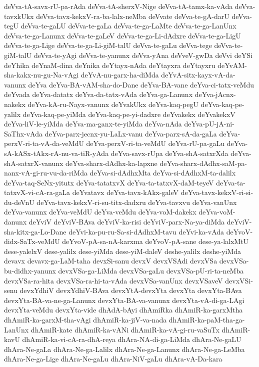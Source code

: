 {deVva-tA-savx-rU-pa-rAda
deVva-tA-sherxV-Nige
deVva-tA-tamx-ka-vAda
deVva-tavxkUkx
deVva-tavx-kekxV-ra-ba-lalx-neMba
deVvate
deVva-te-gA-darU
deVva-tegU
deVva-te-gaLU
deVva-te-gaLa
deVva-te-ga-LaMte
deVva-te-ga-LanUnx
deVva-te-ga-Lanunx
deVva-te-gaLeV
deVva-te-ga-Li-dAdxre
deVva-te-ga-LigU
deVva-te-ga-Lige
deVva-te-ga-Li-giM-talU
deVva-te-gaLu
deVva-tege
deVva-te-giM-talU
deVva-te-yAgi
deVva-te-yanunx
deVva-yAna
deVveV-gwDa
deVvi
deYSi
deYhika
deYnaM-dina
deYnika
deYtayx-nAda
deYtayxra
deYtayxru
deYvAM-sha-kakx-nu-gu-Na-vAgi
deYvA-nu-garx-ha-diMda
deYvA-sitx-kayx-vA-da-vanunx
deYva
deYva-BA-vAM-sha-do-Dane
deYva-BA-vane
deYva-ci-tatx-veMdu
deYvada
deYva-datatx
deYva-da-tatx-vAda
deYva-ga-Lanunx
deYva-jAcnx-nakekx
deYva-kA-ru-Nayx-vanunx
deYvakUkx
deYva-kaq-pegU
deYva-kaq-pe-yalilx
deYva-kaq-pe-yiMda
deYva-kaq-pe-yi-dadxre
deYvakekx
deYvakekxV
deYva-liV-le-yiMda
deYva-ma-ganx-te-yiMda
deYva-nAda
deYva-pU-jA-ni-SaThx-vAda
deYva-parx-jecnx-yu-LaLx-vanu
deYva-parx-sA-da-gaLa
deYva-perxV-ri-ta-vA-da-veMdU
deYva-perxV-ri-ta-veMdU
deYva-rU-pa-gaLu
deYva-sA-kASx-tAkx-rA-nu-va-tiR-yAda
deYva-savx-rUpa
deYva-shA-satxrXda
deYva-shA-satxrX-vanunx
deYva-sharx-dAdhx-ka-lapxne
deYva-sharx-dAdhx-saM-pa-nanx-vA-gi-ru-vu-da-riMda
deYva-si-dAdhxMta
deYva-si-dAdhxM-ta-dalilx
deYva-taq-SeNx-yitutx
deYva-tatatxvX
deYva-ta-tatxvX-daM-teyeV
deYva-ta-tatxvX-vi-cA-ra-gaLa
deYvatavx
deYva-tavx-kAkx-galeV
deYva-tavx-kekxV-ri-si-du-deVnU
deYva-tavx-kekxV-ri-su-titx-dadxru
deYva-tavxvu
deYva-vanUnx
deYva-vanunx
deYva-veMdU
deYva-veMdu
deYva-voM-dakekx
deYva-voM-danunx
deYviV
deYviV-BAva
deYviV-ka-risi
deYviV-parx-Na-ya-diMda
deYviV-sha-kitx-ga-Lo-Dane
deYvi-ka-pu-ru-Sa-si-dAdhxM-tavu
deYvi-ka-vAda
deYvoV-didx-SaTx-veMdU
deYvoV-pA-sa-nA-karxma
deYvoV-pA-sane
dese-ya-lalxMtU
dese-yalelxV
dese-yalilx
dese-yiMda
dese-yiM-daleV
deshe-yalilx
deshe-yiMda
devavx
devavx-ga-LaM-taha
devxSi-sanu
devxV
devxVSAdi
devxVSa
devxVSa-bu-didhx-yanunx
devxVSa-ga-LiMda
devxVSa-gaLu
devxVSa-pU-ri-ta-neMba
devxVSa-ra-hita
devxVSa-ra-hi-ta-vAda
devxVSa-vanUnx
devxVSaveV
devxVSi-senu
devxYdhiV
devxYdhiV-BAva
devxYtA-devxYta
devxYta
devxYta-BAva
devxYta-BA-va-ne-ga-Lanunx
devxYta-BA-va-vanunx
devxYta-vA-di-ga-LAgi
devxYta-veMdu
devxYta-vide
dhAdA-bAyi
dhAmiRka
dhAmiR-ka-garxMtha
dhAmiR-ka-garxM-tha-vAgi
dhAmiR-ka-jiV-va-nada
dhAmiR-ka-paM-tha-ga-LanUnx
dhAmiR-kate
dhAmiR-ka-vANi
dhAmiR-ka-vA-gi-ru-vaSuTx
dhAmiR-kavU
dhAmiR-ka-vi-cA-ra-dhA-reya
dhAra-NA-di-ga-LiMda
dhAra-Ne-gaLU
dhAra-Ne-gaLa
dhAra-Ne-ga-Lalilx
dhAra-Ne-ga-Lanunx
dhAra-Ne-ga-LeMba
dhAra-Ne-ga-Lige
dhAra-Ne-gaLu
dhAra-NiV-gaLu
dhAra-vA-Da-kara
}
